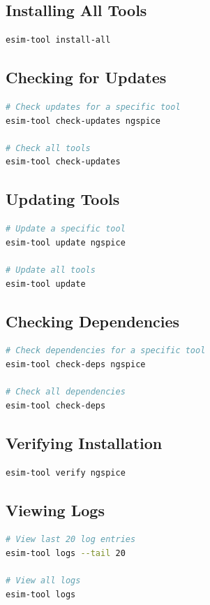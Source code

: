 \documentclass[12pt,a4paper]{report}
\begin{document}
\subsection{Installing All Tools}
\begin{lstlisting}[language=bash]
esim-tool install-all
\end{lstlisting}

\subsection{Checking for Updates}
\begin{lstlisting}[language=bash]
# Check updates for a specific tool
esim-tool check-updates ngspice

# Check all tools
esim-tool check-updates
\end{lstlisting}

\subsection{Updating Tools}
\begin{lstlisting}[language=bash]
# Update a specific tool
esim-tool update ngspice

# Update all tools
esim-tool update
\end{lstlisting}

\subsection{Checking Dependencies}
\begin{lstlisting}[language=bash]
# Check dependencies for a specific tool
esim-tool check-deps ngspice

# Check all dependencies
esim-tool check-deps
\end{lstlisting}

\subsection{Verifying Installation}
\begin{lstlisting}[language=bash]
esim-tool verify ngspice
\end{lstlisting}

\subsection{Viewing Logs}
\begin{lstlisting}[language=bash]
# View last 20 log entries
esim-tool logs --tail 20

# View all logs
esim-tool logs
\end{lstlisting}
\end{document}
